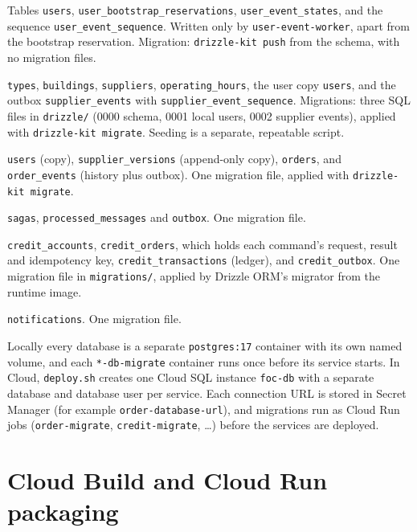 \documentclass[11pt,a4paper]{article}
\newcommand{\code}[1]{\nolinkurl{#1}}
\begin{document}
\begin{description}[style=nextline, leftmargin=0pt, labelsep=0pt, itemsep=4pt]
\item[user-db (\code{users})] Tables \code{users}, \code{user_bootstrap_reservations},
\code{user_event_states}, and the sequence \code{user_event_sequence}. Written only by
\code{user-event-worker}, apart from the bootstrap reservation. Migration:
\code{drizzle-kit push} from the schema, with no migration files.
\item[supplier-db (\code{suppliers})] \code{types}, \code{buildings}, \code{suppliers},
\code{operating_hours}, the user copy \code{users}, and the outbox
\code{supplier_events} with \code{supplier_event_sequence}. Migrations: three SQL files
in \code{drizzle/} (0000 schema, 0001 local users, 0002 supplier events), applied with
\code{drizzle-kit migrate}. Seeding is a separate, repeatable script.
\item[order-db (\code{orders})] \code{users} (copy), \code{supplier_versions}
(append-only copy), \code{orders}, and \code{order_events} (history plus outbox). One
migration file, applied with \code{drizzle-kit migrate}.
\item[saga-db (\code{sagas})] \code{sagas}, \code{processed_messages} and \code{outbox}.
One migration file.
\item[credit-db (\code{credits})] \code{credit_accounts}, \code{credit_orders}, which
holds each command's request, result and idempotency key, \code{credit_transactions}
(ledger), and \code{credit_outbox}. One migration file in \code{migrations/}, applied
by Drizzle ORM's migrator from the runtime image.
\item[notification-db (\code{notifications})] \code{notifications}. One migration file.
\end{description}

Locally every database is a separate \code{postgres:17} container with its own named
volume, and each \code{*-db-migrate} container runs once before its service starts. In
Cloud, \code{deploy.sh} creates one Cloud SQL instance \code{foc-db} with a separate
database and database user per service. Each connection URL is stored in Secret Manager
(for example \code{order-database-url}), and migrations run as Cloud Run jobs
(\code{order-migrate}, \code{credit-migrate}, \ldots) before the services are deployed.

\section{Cloud Build and Cloud Run packaging}
\label{sec:cloudbuild}
\end{document}
